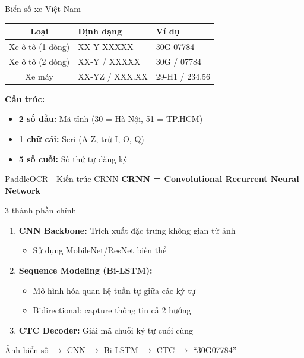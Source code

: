 \begin{frame}{Biển số xe Việt Nam}
    \begin{table}
        \centering
        \small
        \begin{tabular}{|c|l|l|}
            \hline
            \textbf{Loại} & \textbf{Định dạng} & \textbf{Ví dụ} \\
            \hline
            Xe ô tô (1 dòng) & XX-Y XXXXX & 30G-07784 \\
            \hline
            Xe ô tô (2 dòng) & XX-Y / XXXXX & 30G / 07784 \\
            \hline
            Xe máy & XX-YZ / XXX.XX & 29-H1 / 234.56 \\
            \hline
        \end{tabular}
    \end{table}

    \textbf{Cấu trúc:}
    \begin{itemize}
        \item \textbf{2 số đầu:} Mã tỉnh (30 = Hà Nội, 51 = TP.HCM)
        \item \textbf{1 chữ cái:} Seri (A-Z, trừ I, O, Q)
        \item \textbf{5 số cuối:} Số thứ tự đăng ký
    \end{itemize}
\end{frame}

\begin{frame}{PaddleOCR - Kiến trúc CRNN}
    \textbf{CRNN = Convolutional Recurrent Neural Network}

    \begin{block}{3 thành phần chính}
    \begin{enumerate}
        \item \textbf{CNN Backbone:} Trích xuất đặc trưng không gian từ ảnh
        \begin{itemize}
            \item Sử dụng MobileNet/ResNet biến thể
        \end{itemize}
        \item \textbf{Sequence Modeling (Bi-LSTM):}
        \begin{itemize}
            \item Mô hình hóa quan hệ tuần tự giữa các ký tự
            \item Bidirectional: capture thông tin cả 2 hướng
        \end{itemize}
        \item \textbf{CTC Decoder:} Giải mã chuỗi ký tự cuối cùng
    \end{enumerate}
    \end{block}

    \centering
    \small
    Ảnh biển số $\rightarrow$ CNN $\rightarrow$ Bi-LSTM $\rightarrow$ CTC $\rightarrow$ ``30G07784''
\end{frame}

